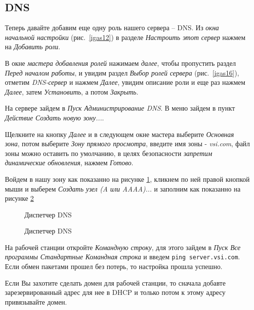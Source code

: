 \subsection{DNS}
Теперь давайте добавим еще одну роль нашего сервера -- DNS. Из \textit{окна начальной настройки} (рис.~\ref{igas12}) в разделе \textit{Настроить этот сервер} нажмем на \textit{Добавить роли}.
\par
В окне \textit{мастера добавления ролей} нажимаем \textit{далее}, чтобы пропустить раздел \textit{Перед началом работы}, и увидим раздел \textit{Выбор ролей сервера} (рис.~\ref{igas16}), отметим \textit{DNS-сервер} и нажмем \textit{Далее}, увидим описание роли и еще раз нажмем \textit{Далее}, затем \emph{Установить}, а потом \emph{Закрыть}.
\par
На сервере зайдем в \emph{Пуск \DLE Администрирование \DLE DNS}. В меню зайдем в пункт \emph{Действие \DLE Создать новую зону...}.
\par
Щелкните на кнопку \emph{Далее} и в следующем окне мастера выберите \emph{Основная зона}, потом выберите \emph{Зону прямого просмотра}, введите имя зоны - \emph{vsi.com}, файл зоны можно оставить по умолчанию, в целях безопасности \emph{запретим динамические обновления}, нажмем \emph{Готово}.
\par
Войдем в нашу зону как показанно на рисунке \ref{dnsi1}, кликнем по ней правой кнопкой мыши и выберем \emph{Создать узел (A или AAAA)...} и заполним как показанно на рисунке \ref{dnsi2}
\begin{figure}[H]
\caption{Диспетчер DNS}
\label{dnsi1}
\end{figure}
\begin{figure}[H]
\caption{Диспетчер DNS}
\label{dnsi2}
\end{figure}
На рабочей станции откройте \emph{Командную строку}, для этого зайдем в \textit{Пуск \DLE Все программы \DLE Стандартные \DLE Командная строка} и введем \texttt{ping server.vsi.com}. Если обмен пакетами прошел без потерь, то настройка прошла успешно.
\par
Если Вы захотите сделать домен для рабочей станции, то сначала добавте зарезервированный адрес для нее в DHCP и только потом к этому адресу привязывайте домен.